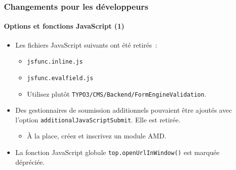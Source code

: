 \begin{frame}[fragile]
	\frametitle{Changements pour les développeurs}
	\framesubtitle{Options et fonctions JavaScript (1)}

	\begin{itemize}
		\item Les fichiers JavaScript suivants ont été retirés~:

			\begin{itemize}
				\item \texttt{jsfunc.inline.js}
				\item \texttt{jsfunc.evalfield.js}
			\end{itemize}

			\begin{itemize}\smaller
				\item[\ding{228}] Utilisez plutôt \texttt{TYPO3/CMS/Backend/FormEngineValidation}.
			\end{itemize}\normalsize

		\item Des gestionnaires de soumission additionnels pouvaient être ajoutés avec l'option
			\texttt{additionalJavaScriptSubmit}. Elle est retirée.

			\begin{itemize}\smaller
				\item[\ding{228}] À la place, créez et inscrivez un module AMD.
			\end{itemize}\normalsize

		\item La fonction JavaScript globale \texttt{top.openUrlInWindow()} est marquée dépréciée.

	\end{itemize}

\end{frame}


